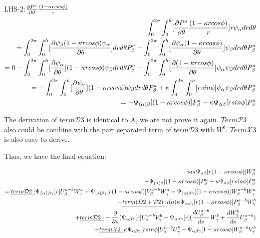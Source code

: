 \documentclass{Note}
\begin{document}
LHS-2:${\partial P^a \over \partial \theta }{(1-\kappa r cos\phi)\over r}$
\begin{equation}
\begin{aligned}
\int_0^{2\pi} \int_0^h [{\partial P^a \over \partial \theta }{(1-\kappa r cos\phi)\over r}] r\psi_\alpha dr d\theta\\
=\int_0^{2\pi} \int_0^h [{\partial \psi_\beta (1-\kappa r cos\phi) \psi_\alpha \over \partial \theta}]dr d\theta P_\beta^a
-\int_0^{2\pi} \int_0^h [{\partial \psi_\alpha (1-\kappa r cos\phi) \over \partial \theta}]\psi_\beta dr d\theta P_\beta^a\\
=0
-\int_0^{2\pi} \int_0^h [{\partial \psi_\alpha \over \partial \theta}](1-\kappa r cos\phi) \psi_\beta dr d\theta P_\beta^a
-\int_0^{2\pi} \int_0^h [{\partial (1-\kappa r cos\phi)  \over \partial \theta}] \psi_\alpha\psi_\beta dr d\theta P_\beta^a\\
=-\int_0^{2\pi} \int_0^h [{\partial \psi_\alpha \over \partial \theta}](1-\kappa r cos\phi) \psi_\beta dr d\theta P_\beta^a
+\kappa \int_0^{2\pi} \int_0^h [ r sin\phi] \psi_\alpha\psi_\beta dr d\theta P_\beta^a\\
=
-\Psi_{(\alpha)\beta}[(1-\kappa r cos\phi)]P_\beta^a-\kappa \Psi_{\alpha\beta}[r sin\phi]P_\beta^a
\end{aligned}
\end{equation}

The derivation of $term\mathcal{D}3$ is identical to A, we are not prove it again. $Term\mathcal{P}3$ also could be combine with the part separated term of  $term\mathcal{D}3$ with $W^b$.  $Term\mathcal{X}3$ is also easy to derive.


Thus, we have the final equation:

\begin{equation}
\begin{aligned}
-ia\kappa \Psi_{\alpha\beta}[r(1-\kappa rcos\phi)]W_\beta^a\\
-\Psi_{(\alpha)\beta}[(1-\kappa r cos\phi)]P_\beta^a-\kappa \Psi_{\alpha\beta}[r sin\phi]P_\beta^a\\
=
\underline{term \mathcal{D}2:}  \Psi_{\{\alpha\}\beta\gamma} [r]U_\beta^{a-b}W_\gamma^a
+\Psi_{[\alpha]\beta\gamma} [r(1-\kappa rcos\phi)]V_\beta^{a-b}W_\gamma^a
+ \Psi_{(\alpha)\beta\gamma} [(1-\kappa rcos\phi)]W_\beta^{a-b}W_\gamma^a\\
+\underline{term\mathcal({D}2+\mathcal{P}2):}  i(a)\kappa \Psi_{\alpha\beta\gamma}[r(1-\kappa r cos\phi)]P_\beta^{a-b}W_\gamma^{b}\\
+\underline{term \mathcal{D}2:} -{{\partial }\over {\partial s}}(\Psi_{\alpha\beta\gamma}[r]U_\beta^{a-b}V_\gamma^{b}
-\Psi_{\alpha\beta\gamma}[r]({{d U_\beta^{a-b} \over {d s}}W_\gamma^{b}}+{dW_\gamma^{b}\over ds}U_\beta^{a-b})\\
+\underline{term \mathcal{X}2:} \kappa \Psi_{\alpha\beta\gamma}[rsin\phi]U_\beta^{a-b}U_\gamma^b- \Psi_{\alpha\beta\gamma}[1-\kappa r cos\phi]W_\beta^{a-b}V_\gamma^b\\
\end{aligned}
\end{equation}
\end{document}
